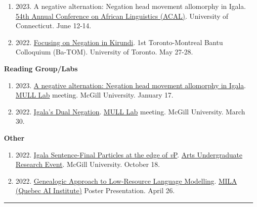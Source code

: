 \documentclass[margin,line]{resume}
\begin{document}
\begin{resume}
\begin{enumerate}[-, leftmargin=1em, topsep=4pt]
		\newpage
		\item[] {2023. A negative alternation: Negation head movement allomorphy in Igala. \href{https://uconnuecs.cventevents.com/event/aef2d257-6a6a-41b5-b83d-2c6efc60aac5/summary}{54th Annual Conference on African Linguistics (ACAL)}. University of Connecticut. June 12-14.}
		
		\item[] {2022. \href{https://mcling.blogs.mcgill.ca/2022/05/24/mcgill-at-ba-tom-1/}{Focusing on Negation in Kirundi}. 1st Toronto-Montreal Bantu Colloquium (Ba-TOM). University of Toronto. May 27-28.}
	\end{enumerate}
	

	\textbf{Reading Group/Labs}
	\begin{enumerate}[-, leftmargin=1em, topsep=4pt]
		\item[] {2023. \href{https://mcling.blogs.mcgill.ca/2023/01/15/mull-lab-1-17-brandon-chaperon/}{A negative alternation: Negation head movement allomorphy in Igala}. \href{https://mull-lab.org/}{MULL Lab} meeting. McGill University. January 17.}

		\item[] {2022. \href{https://mcling.blogs.mcgill.ca/2022/03/27/mull-lab-03-30-brandon-chaperon/}{Igala's Dual Negation}. \href{https://mull-lab.org/}{MULL Lab} meeting. McGill University. March 30.}
	\end{enumerate}

	\textbf{Other}
	\begin{enumerate}[-, leftmargin=1em, topsep=4pt]
		\item[] {2022. \href{https://www.mcgill.ca/arts-internships/files/arts-internships/brandon_chaperon.pdf}{Igala Sentence-Final Particles at the edge of \textit{v}P}. \href{https://www.mcgill.ca/arts-internships/events-0/#block-bean-annual-faculty-of-arts-undergrad}{Arts Undergraduate Research Event}. McGill University. October 18.}

		\item[] {2022. \href{https://github.com/dopestdope123/LING484-Final-Projects}{Genealogic Approach to Low-Resource Language Modelling}. \href{https://mila.quebec/en/}{MILA (Quebec AI Institute)} Poster Presentation. April 26.}

	\end{enumerate}


	\vspace{-0.6em}\rule{\textwidth}{0.4pt}



\end{resume}
\end{document}
